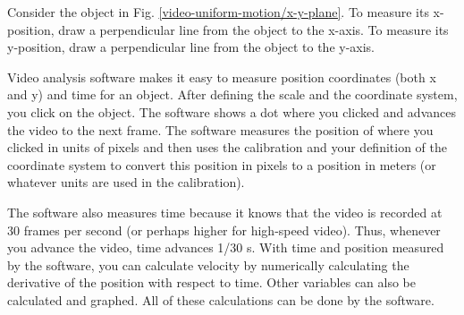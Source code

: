 Consider the object in Fig. \ref{video-uniform-motion/x-y-plane}. To measure its x-position, draw a perpendicular line from the object to the x-axis. To measure its y-position, draw a perpendicular line from the object to the y-axis.




Video analysis software makes it easy to measure position coordinates (both x and y) and time for an object. After defining the scale and the coordinate system, you click on the object. The software shows a dot where you clicked and advances the video to the next frame. The software measures the position of where you clicked in units of pixels and then uses the calibration and your definition of the coordinate system to convert this position in pixels to a position in meters (or whatever units are used in the calibration).

The software also measures time because it knows that the video is recorded at 30 frames per second (or perhaps higher for high-speed video). Thus, whenever you advance the video, time advances 1/30 s. With time and position measured by the software, you can calculate velocity by numerically calculating the derivative of the position with respect to time. Other variables can also be calculated and graphed. All of these calculations can be done by the software.





